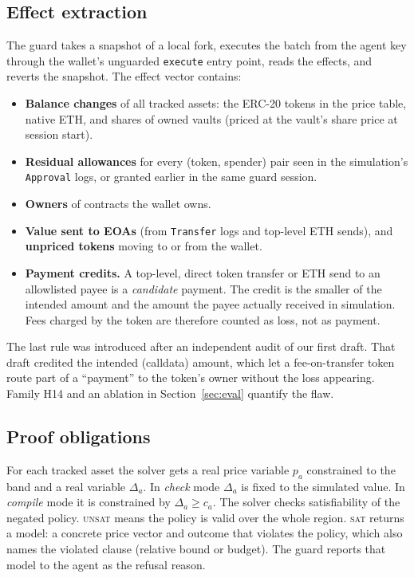 \documentclass[11pt]{article}
\begin{document}
\subsection{Effect extraction}
The guard takes a snapshot of a local fork, executes the batch from the agent key through the wallet's unguarded \texttt{execute} entry point, reads the effects, and reverts the snapshot. The effect vector contains:
\begin{itemize}
\item \textbf{Balance changes} of all tracked assets: the ERC-20 tokens in the price table, native ETH, and shares of owned vaults (priced at the vault's share price at session start).
\item \textbf{Residual allowances} for every (token, spender) pair seen in the simulation's \texttt{Approval} logs, or granted earlier in the same guard session.
\item \textbf{Owners} of contracts the wallet owns.
\item \textbf{Value sent to EOAs} (from \texttt{Transfer} logs and top-level ETH sends), and \textbf{unpriced tokens} moving to or from the wallet.
\item \textbf{Payment credits.} A top-level, direct token transfer or ETH send to an allowlisted payee is a \emph{candidate} payment. The credit is the smaller of the intended amount and the amount the payee actually received in simulation. Fees charged by the token are therefore counted as loss, not as payment.
\end{itemize}
The last rule was introduced after an independent audit of our first draft. That draft credited the intended (calldata) amount, which let a fee-on-transfer token route part of a ``payment'' to the token's owner without the loss appearing. Family H14 and an ablation in Section~\ref{sec:eval} quantify the flaw.

\subsection{Proof obligations}
For each tracked asset the solver gets a real price variable $p_a$ constrained to the band and a real variable $\Delta_a$. In \emph{check} mode $\Delta_a$ is fixed to the simulated value. In \emph{compile} mode it is constrained by $\Delta_a\ge c_a$. The solver checks satisfiability of the negated policy. \textsc{unsat} means the policy is valid over the whole region. \textsc{sat} returns a model: a concrete price vector and outcome that violates the policy, which also names the violated clause (relative bound or budget). The guard reports that model to the agent as the refusal reason.
\end{document}
